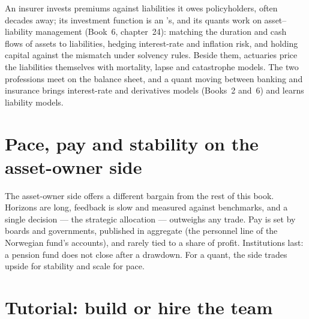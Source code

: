 An insurer invests premiums against liabilities it owes policyholders, often decades away; its investment function is
an 's, and its quants work on asset--liability management (Book~6, chapter~24): matching the duration and
cash flows of assets to liabilities, hedging interest-rate and inflation risk, and holding capital against the mismatch
under solvency rules. Beside them, actuaries price the liabilities themselves with mortality, lapse and
catastrophe models. The two professions meet on the balance sheet, and a quant moving between banking and insurance
brings interest-rate and derivatives models (Books~2 and~6) and learns liability models.

\section{Pace, pay and stability on the asset-owner side}

The asset-owner side offers a different bargain from the rest of this book. Horizons are long, feedback is slow and
measured against benchmarks, and a single decision --- the strategic allocation --- outweighs any trade. Pay is set by
boards and governments, published in aggregate (the personnel line of the Norwegian fund's accounts), and rarely tied
to a share of profit. Institutions last: a pension fund does not close after a drawdown. For a quant, the side trades
upside for stability and scale for pace.

\section{Tutorial: build or hire the team}\label{tut:in:asset-managers-pensions-sovereign-funds-and-insurers:tut}


